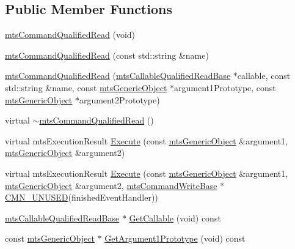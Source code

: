 \subsection*{Public Member Functions}
\begin{DoxyCompactItemize}
\item 
\hyperlink{classmts_command_qualified_read_a8e6ae9f298cbc23e90768ace8842035d}{mts\+Command\+Qualified\+Read} (void)
\item 
\hyperlink{classmts_command_qualified_read_a0a67c7082075e6033ea28aa42aae8620}{mts\+Command\+Qualified\+Read} (const std\+::string \&name)
\item 
\hyperlink{classmts_command_qualified_read_a5e45546521fe7cc27a066a9f739481be}{mts\+Command\+Qualified\+Read} (\hyperlink{classmts_callable_qualified_read_base}{mts\+Callable\+Qualified\+Read\+Base} $\ast$callable, const std\+::string \&name, const \hyperlink{classmts_generic_object}{mts\+Generic\+Object} $\ast$argument1\+Prototype, const \hyperlink{classmts_generic_object}{mts\+Generic\+Object} $\ast$argument2\+Prototype)
\item 
virtual \hyperlink{classmts_command_qualified_read_a10dd4312bf5540ab1d6920b340d19416}{$\sim$mts\+Command\+Qualified\+Read} ()
\item 
virtual mts\+Execution\+Result \hyperlink{classmts_command_qualified_read_a73cccb8b94623c25bcda6b4f34cdfb78}{Execute} (const \hyperlink{classmts_generic_object}{mts\+Generic\+Object} \&argument1, \hyperlink{classmts_generic_object}{mts\+Generic\+Object} \&argument2)
\item 
virtual mts\+Execution\+Result \hyperlink{classmts_command_qualified_read_ae04d6c7d7c4b92a39aeaf4917fa4bead}{Execute} (const \hyperlink{classmts_generic_object}{mts\+Generic\+Object} \&argument1, \hyperlink{classmts_generic_object}{mts\+Generic\+Object} \&argument2, \hyperlink{classmts_command_write_base}{mts\+Command\+Write\+Base} $\ast$\hyperlink{cmn_portability_8h_a021894e2626935fa2305434b1e893ff6}{C\+M\+N\+\_\+\+U\+N\+U\+S\+E\+D}(finished\+Event\+Handler))
\item 
\hyperlink{classmts_callable_qualified_read_base}{mts\+Callable\+Qualified\+Read\+Base} $\ast$ \hyperlink{classmts_command_qualified_read_a6466134df979d8aebe21de71917eb967}{Get\+Callable} (void) const 
\item 
const \hyperlink{classmts_generic_object}{mts\+Generic\+Object} $\ast$ \hyperlink{classmts_command_qualified_read_abe69997dbd70d429668e14861936e179}{Get\+Argument1\+Prototype} (void) const 
\item 

\end{DoxyCompactItemize}
